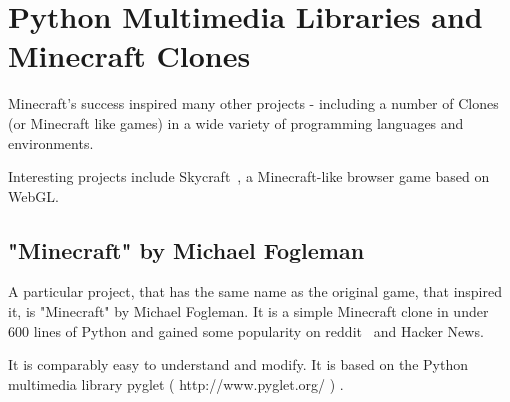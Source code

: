 \section{Python Multimedia Libraries and Minecraft Clones}
Minecraft's success inspired many other projects - including a number of Clones (or Minecraft like games) in a wide variety of programming languages and environments.

Interesting projects include Skycraft~\cite{skycraft}, a Minecraft-like browser game based on WebGL.

        \subsection{"Minecraft" by Michael Fogleman}
A particular project, that has the same name as the original game, that inspired it, is "Minecraft" by Michael Fogleman. It is a simple Minecraft clone in under 600 lines of Python and gained some popularity on reddit~\cite{fogle-reddit} and Hacker News.~\cite{fogle_hn}

It is comparably easy to understand and modify. It is based on the Python multimedia library pyglet ( http://www.pyglet.org/ ) .

